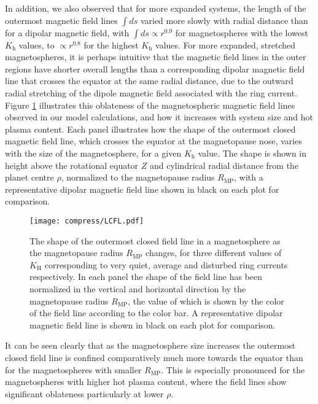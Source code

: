 In addition, we also observed that for more expanded systems, the length of the outermost magnetic field lines $\int ds$ varied more slowly with radial distance than for a dipolar magnetic field, with $\int ds \propto r^{0.9}$ for magnetospheres with the lowest $K_\mathrm{h}$ values, to $\propto r^{0.8}$ for the highest $K_\mathrm{h}$ values. For more expanded, stretched magnetospheres, it is perhaps intuitive that the magnetic field lines in the outer regions have shorter overall lengths than a corresponding dipolar magnetic field line that crosses the equator at the same radial distance, due to the outward radial stretching of the dipole magnetic field associated with the ring current. Figure \ref{compress:fig:LCFL} illustrates this oblateness of the magnetospheric magnetic field lines observed in our model calculations, and how it increases with system size and hot plasma content. Each panel illustrates how the shape of the outermost closed magnetic field line, which crosses the equator at the magnetopause nose, varies with the size of the magnetosphere, for a given $K_\mathrm{h}$ value. The shape is shown in height above the rotational equator $Z$ and cylindrical radial distance from the planet centre $\rho$, normalized to the magnetopause radius $R_\mathrm{MP}$, with a representative dipolar magnetic field line shown in black on each plot for comparison.
\begin{figure}
\centering
\noindent\texttt{[image: compress/LCFL.pdf]}
\caption[Outermost magnetic field line shapes for the range in system size, $K_\mathrm{H}$ parameter space.]{The shape of the outermost closed field line in a magnetosphere as the magnetopause radius $R_\mathrm{MP}$ changes, for three different values of $K_\mathrm{H}$ corresponding to very quiet, average and disturbed ring currents respectively. In each panel the shape of the field line has been normalized in the vertical and horizontal direction by the magnetopause radius $R_\mathrm{MP}$, the value of which is shown by the color of the field line according to the color bar. A representative dipolar magnetic field line is shown in black on each plot for comparison.}
\label{compress:fig:LCFL}
\end{figure}

It can be seen clearly that as the magnetosphere size increases the outermost closed field line is confined comparatively much more towards the equator than for the magnetospheres with smaller $R_\mathrm{MP}$. This is especially pronounced for the magnetospheres with higher hot plasma content, where the field lines show significant oblateness particularly at lower $\rho$. 

